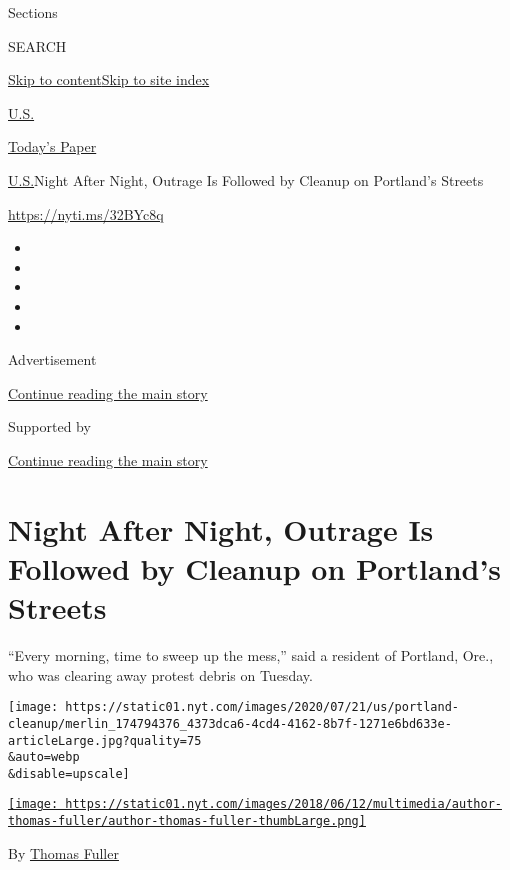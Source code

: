 Sections

SEARCH

\protect\hyperlink{site-content}{Skip to
content}\protect\hyperlink{site-index}{Skip to site index}

\href{https://www.nytimes.com/section/us}{U.S.}

\href{https://myaccount.nytimes.com/auth/login?response_type=cookie\&client_id=vi}{}

\href{https://www.nytimes.com/section/todayspaper}{Today's Paper}

\href{/section/us}{U.S.}\textbar{}Night After Night, Outrage Is Followed
by Cleanup on Portland's Streets

\url{https://nyti.ms/32BYc8q}

\begin{itemize}
\item
\item
\item
\item
\item
\end{itemize}

Advertisement

\protect\hyperlink{after-top}{Continue reading the main story}

Supported by

\protect\hyperlink{after-sponsor}{Continue reading the main story}

\hypertarget{night-after-night-outrage-is-followed-by-cleanup-on-portlands-streets}{%
\section{Night After Night, Outrage Is Followed by Cleanup on Portland's
Streets}\label{night-after-night-outrage-is-followed-by-cleanup-on-portlands-streets}}

``Every morning, time to sweep up the mess,'' said a resident of
Portland, Ore., who was clearing away protest debris on Tuesday.

\texttt{[image: https://static01.nyt.com/images/2020/07/21/us/portland-cleanup/merlin\_174794376\_4373dca6-4cd4-4162-8b7f-1271e6bd633e-articleLarge.jpg?quality=75\\\&auto=webp\\\&disable=upscale]}

\href{https://www.nytimes.com/by/thomas-fuller}{\texttt{[image: https://static01.nyt.com/images/2018/06/12/multimedia/author-thomas-fuller/author-thomas-fuller-thumbLarge.png]}}

By \href{https://www.nytimes.com/by/thomas-fuller}{Thomas Fuller}

